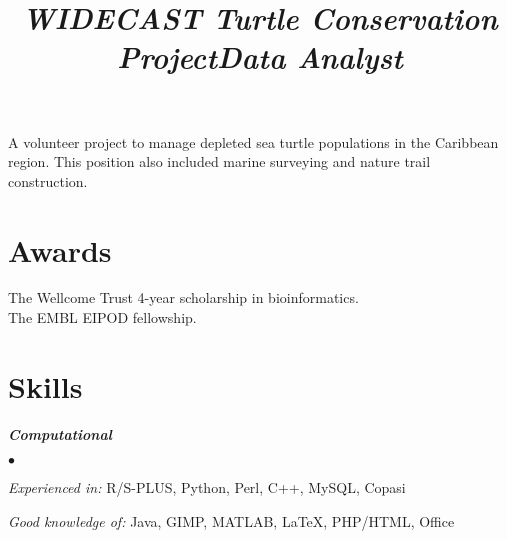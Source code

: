 \documentclass[overlapped, line, 11pt, letterpaper]{res}
\renewenvironment{itemize}{
\begin{list}{$\bullet$}
{\setlength{\itemsep}{0cm}}
}{\end{list}}
\begin{document}
\begin{resume}
\title{\it WIDECAST Turtle Conservation Project} 
\begin{position}
A volunteer project to manage depleted sea turtle populations in the Caribbean region. This position also included marine surveying and nature trail construction.
\end{position}

\title{\it Data Analyst} 


\section{Awards}
The Wellcome Trust 4-year scholarship in bioinformatics. \\
The EMBL EIPOD fellowship.

\section{Skills}
\textbf{\emph{Computational}}
\begin{itemize}
\item \emph{Experienced in:} R/S-PLUS, Python, Perl, C++, MySQL, Copasi 
\item \emph{Good knowledge of:} Java, GIMP, MATLAB, \LaTeX, PHP/HTML, Office 
\end{itemize}



\end{resume}
\end{document}
